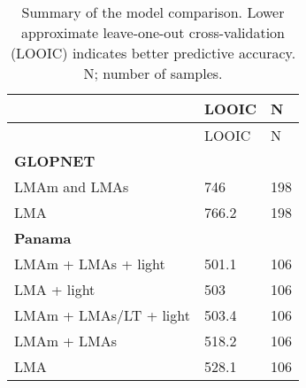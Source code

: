 \documentclass[
  12pt,
]{article}
\providecommand{\DIFaddbegin}{} %
\providecommand{\DIFaddend}{} %
\providecommand{\DIFdelbegin}{} %
\providecommand{\DIFdelend}{} %
\newcommand{\DIFscaledelfig}{0.5}
\newlength{\DIFdelgraphicswidth} %
\newlength{\DIFdelgraphicsheight} %
\newcommand{\DIFaddincludegraphics}[2][]{{\color{blue}\fbox{\DIFOincludegraphics[#1]{#2}}}} %
\newcommand{\DIFdelincludegraphics}[2][]{%
\sbox{\DIFdelgraphicsbox}{\DIFOincludegraphics[#1]{#2}}%
\settoboxwidth{\DIFdelgraphicswidth}{\DIFdelgraphicsbox} %
\settoboxtotalheight{\DIFdelgraphicsheight}{\DIFdelgraphicsbox} %
\scalebox{\DIFscaledelfig}{%
\parbox[b]{\DIFdelgraphicswidth}{\usebox{\DIFdelgraphicsbox}\\[-\baselineskip] \rule{\DIFdelgraphicswidth}{0em}}\llap{\resizebox{\DIFdelgraphicswidth}{\DIFdelgraphicsheight}{%
\setlength{\unitlength}{\DIFdelgraphicswidth}%
\begin{picture}(1,1)%
\thicklines\linethickness{2pt} %
{\color[rgb]{1,0,0}\put(0,0){\framebox(1,1){}}}%
{\color[rgb]{1,0,0}\put(0,0){\line( 1,1){1}}}%
{\color[rgb]{1,0,0}\put(0,1){\line(1,-1){1}}}%
\end{picture}%
}\hspace*{3pt}}} %
} %
\DeclareRobustCommand{\DIFaddbegin}{\DIFOaddbegin \let\includegraphics\DIFaddincludegraphics} %
\DeclareRobustCommand{\DIFaddend}{\DIFOaddend \let\includegraphics\DIFOincludegraphics} %
\DeclareRobustCommand{\DIFdelbegin}{\DIFOdelbegin \let\includegraphics\DIFdelincludegraphics} %
\DeclareRobustCommand{\DIFdelend}{\DIFOaddend \let\includegraphics\DIFOincludegraphics} %
\begin{document}
\begin{longtable}[]{@{}lll@{}}
\caption{\label{tab:lootab} Summary of the model comparison. Lower approximate leave-one-out cross-validation (LOOIC) indicates better predictive accuracy. N; number of samples.}\tabularnewline
\toprule
& LOOIC & N \DIFdelbegin %
\DIFdelend \DIFaddbegin \\
\DIFaddend \midrule
\endfirsthead
\toprule
& LOOIC & N \DIFdelbegin %
\DIFdelend \DIFaddbegin \\
\DIFaddend \midrule
\endhead
\textbf{GLOPNET} & & \DIFdelbegin %
\DIFdelend \DIFaddbegin \\
\DIFaddend LMAm and LMAs & 746 & 198 \DIFdelbegin %
\DIFdelend \DIFaddbegin \\
\DIFaddend LMA & 766.2 & 198 \DIFdelbegin %
\DIFdelend \DIFaddbegin \\
\DIFaddend \textbf{Panama} & & \DIFdelbegin %
\DIFdelend \DIFaddbegin \\
\DIFaddend LMAm + LMAs + light & 501.1 & 106 \DIFdelbegin %
\DIFdelend \DIFaddbegin \\
\DIFaddend LMA + light & 503 & 106 \DIFdelbegin %
\DIFdelend \DIFaddbegin \\
\DIFaddend LMAm + LMAs/LT + light & 503.4 & 106 \DIFdelbegin %
\DIFdelend \DIFaddbegin \\
\DIFaddend LMAm + LMAs & 518.2 & 106 \DIFdelbegin %
\DIFdelend \DIFaddbegin \\
\DIFaddend LMA & 528.1 & 106 \DIFdelbegin %
\DIFdelend \DIFaddbegin \\
\DIFaddend \bottomrule
\end{longtable}

\newpage

\hypertarget{section-1}{%
\section{}\label{section-1}}
\end{document}
